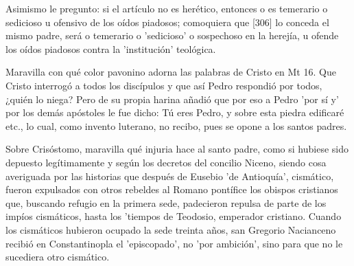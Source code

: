 Asimismo le pregunto: si el artículo no es herético, entonces o es temerario o sedicioso u ofensivo de los oídos piadosos; comoquiera que [306] lo conceda el mismo padre, será o temerario o 'sedicioso' o sospechoso en la herejía, u ofende los oídos piadosos contra la 'institución' teológica.

Maravilla con qué color pavonino adorna las palabras de Cristo en Mt 16. Que Cristo interrogó a todos los discípulos y que así Pedro respondió por todos, ¿quién lo niega? Pero de su propia harina añadió que por eso a Pedro 'por sí y' por los demás apóstoles le fue dicho: Tú eres Pedro, y sobre esta piedra edificaré etc., lo cual, como invento luterano, no recibo, pues se opone a los santos padres.

Sobre Crisóstomo, maravilla qué injuria hace al santo padre, como si hubiese sido depuesto legítimamente y según los decretos del concilio Niceno, siendo cosa averiguada por las historias que después de Eusebio 'de Antioquía', cismático, fueron expulsados con otros rebeldes al Romano pontífice los obispos cristianos que, buscando refugio en la primera sede, padecieron repulsa de parte de los impíos cismáticos, hasta los 'tiempos de Teodosio, emperador cristiano. Cuando los cismáticos hubieron ocupado la sede treinta años, san Gregorio Nacianceno recibió en Constantinopla el 'episcopado', no 'por ambición', sino para que no le sucediera otro cismático.

